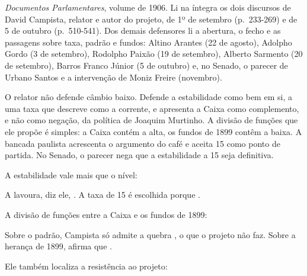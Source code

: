 

\textit{Documentos Parlamentares}, volume de 1906. Li na íntegra os dois
discursos de David Campista, relator e autor do projeto, de 1º de setembro
(p.~233-269) e de 5 de outubro (p.~510-541). Dos demais defensores li a
abertura, o fecho e as passagens sobre taxa, padrão e fundos: Altino Arantes
(22 de agosto), Adolpho Gordo (3 de setembro), Rodolpho Paixão (19 de
setembro), Alberto Sarmento (20 de setembro), Barros Franco Júnior (5 de
outubro) e, no Senado, o parecer de Urbano Santos e a intervenção de Moniz
Freire (novembro).


O relator não defende câmbio baixo. Defende a estabilidade como bem em si, a
uma taxa que descreve como a corrente, e apresenta a Caixa como complemento, e
não como negação, da política de Joaquim Murtinho. A divisão de funções que ele
propõe é simples: a Caixa contém a alta, os fundos de 1899 contêm a baixa. A
bancada paulista acrescenta o argumento do café e aceita 15 como ponto de
partida. No Senado, o parecer nega que a estabilidade a 15 seja definitiva.


A estabilidade vale mais que o nível:


A lavoura, diz ele,  . A taxa de 15 é escolhida porque  .

A divisão de funções entre a Caixa e os fundos de 1899:


Sobre o padrão, Campista só admite a quebra  , o que o projeto não
faz. Sobre a herança de 1899, afirma que  .

Ele também localiza a resistência ao projeto:

